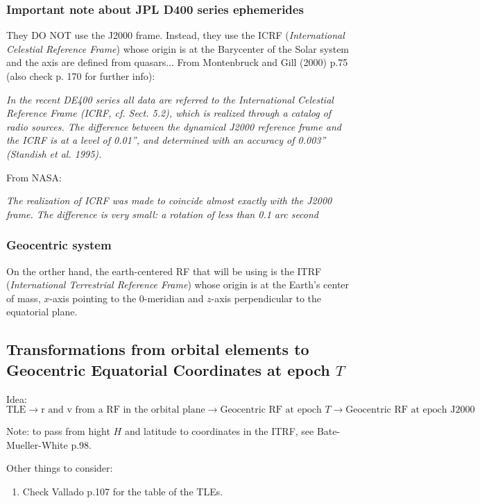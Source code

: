 \documentclass[10pt,a4paper]{article}
\newcommand{\vf}[1]{\boldsymbol{\mathrm{#1}}} %
\theoremstyle{definition}
\begin{document}
\subsubsection{Important note about JPL D400 series ephemerides}
They DO NOT use the J2000 frame. Instead, they use the ICRF (\emph{International Celestial Reference Frame}) whose origin is at the Barycenter of the Solar system and the axis are defined from quasars... From Montenbruck and Gill (2000) p.75 (also check p. 170 for further info):

\textit{ In the recent DE400 series all data are referred to the International Celestial Reference Frame (ICRF, cf. Sect. 5.2), which is realized through a catalog of radio sources. The difference between the dynamical J2000 reference frame and the ICRF is at a level of 0.01'', and determined with an accuracy of 0.003'' (Standish et al. 1995).}

From NASA:

\textit{ The realization of ICRF was made to coincide almost exactly with the J2000 frame. The difference is very small: a rotation of less than 0.1 arc second}

\subsubsection{Geocentric system}
On the orther hand, the earth-centered RF that will be using is the ITRF (\emph{International Terrestrial Reference Frame}) whose origin is at the Earth's center of mass, $x$-axis pointing to the 0-meridian and $z$-axis perpendicular to the equatorial plane.


\subsection{Transformations from orbital elements to Geocentric Equatorial Coordinates at epoch \texorpdfstring{$T$}{T}}

Idea: $$\mathrm{TLE}\to\vf{r}\text{ and }\vf{v}\text{ from a RF in the orbital plane}\to \text{Geocentric RF at epoch $T$}\to\text{Geocentric RF at epoch J2000}$$

Note: to pass from hight $H$ and latitude to coordinates in the ITRF, see Bate-Mueller-White p.98.



Other things to consider:
\begin{enumerate}
  \item Check Vallado p.107 for the table of the TLEs.
\end{enumerate}
\end{document}
